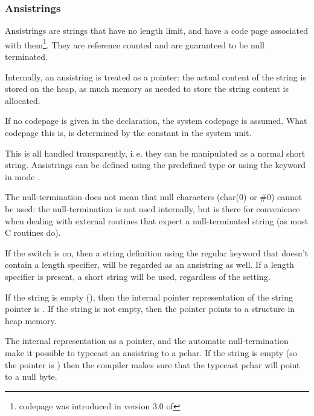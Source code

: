 \subsubsection{Ansistrings}
Ansistrings are strings that have no length limit, and have a code page associated with
them\footnote{codepage was introduced in version 3.0 of \fpc}.
They are reference counted and are guaranteed to be null terminated.

Internally, an ansistring is treated as a pointer: the actual content of the string is stored on the heap, as much
memory as needed to store the string content is allocated.

If no codepage is given in the declaration, the system codepage is assumed.
What codepage this is, is determined by the  constant in the system unit.

This is all handled transparently, i.\,e. they can be manipulated as a normal
short string. Ansistrings can be defined using the predefined 
type or using the  keyword in mode .

\begin{remark}
The null-termination does not mean that null characters (char(0) or \#0)
cannot be used: the null-termination is not used internally, but is there for
convenience when dealing with external routines that expect a
null-terminated string (as most C routines do).
\end{remark}

If the  switch is on, then a string definition using the
regular  keyword that doesn't contain a length specifier,
will be regarded as an ansistring as well. If a length specifier is present,
a short string will be used, regardless of the  setting.

If the string is empty (), then the internal pointer representation
of the string pointer is . If the string is not empty, then the
pointer points to a structure in heap memory.

The internal representation as a pointer, and the automatic null-termination
make it possible to typecast an ansistring to a pchar. If the string is empty
(so the pointer is ) then the compiler makes sure that the typecast
pchar will point to a null byte.

